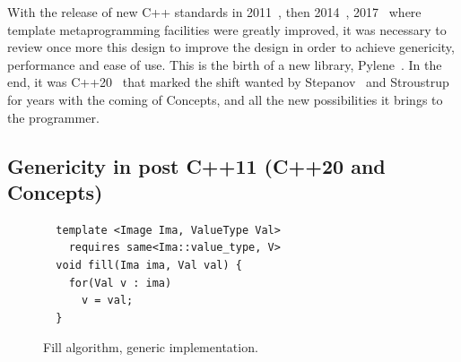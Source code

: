 With the release of new C++ standards in 2011~\parencite{iso.2011.cpp}, then 2014~\parencite{iso.2014.cpp},
2017~\parencite{iso.2017.cpp} where template metaprogramming facilities were greatly improved, it was necessary to
review once more this design to improve the design in order to achieve genericity, performance and ease of use. This is
the birth of a new library, Pylene~\parencite{carlinet.2018.pylena}. In the end, it was C++20~\parencite{iso.2011.cpp}
that marked the shift wanted by
Stepanov~\parencite{musser.1988.generic,musser.1994.algorithm,dehnert.1998.fundamentals,stepanov.2009.elements} and
Stroustrup~\parencite{stroustrup.1995.design,stroustrup.1999.hot,stroustrup.2003.concepts,stroustrup.2007.hopl} for
years with the coming of Concepts, and all the new possibilities it brings to the programmer.

\subsection{Genericity in post C++11 (C++20 and Concepts)}
\label{sec:postcpp11}

\begin{figure}[htbp]
  \centering
  \begin{verbatim}
  template <Image Ima, ValueType Val>
    requires same<Ima::value_type, V>
  void fill(Ima ima, Val val) {
    for(Val v : ima)
      v = val;
  }
  \end{verbatim}

  \caption{Fill algorithm, generic implementation.}
  \label{code:gen.fill}
\end{figure}

